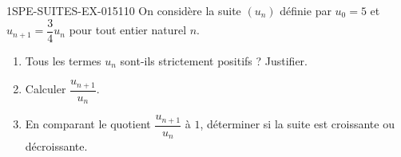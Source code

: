 \begin{exercice}{1SPE-SUITES-EX-015}{1}{10}
On considère la suite $(u_n)$ définie par $u_0 = 5$ et $u_{n+1} = \dfrac{3}{4} u_n$ pour tout entier naturel $n$.
\begin{enumerate}
  \item Tous les termes $u_n$ sont-ils strictement positifs ? Justifier.
  \item Calculer $\dfrac{u_{n+1}}{u_n}$.
  \item En comparant le quotient $\dfrac{u_{n+1}}{u_n}$ à $1$, déterminer si la suite est croissante ou décroissante.
\end{enumerate}
\end{exercice}
